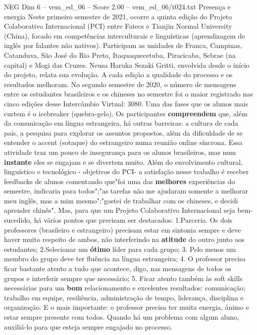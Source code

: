 \begin{textsample}{NEG Dim 6 – vem\_ed\_06 – Score 2.00 – vem\_ed\_06/t024.txt}  \label{ex:f6_neg_086}
Presença e energia Neste primeiro semestre de 2021, ocorre a quinta edição do Projeto Colaborativo Internacional (PCI) entre Fatecs e Tianjin Normal University (China), focado em competências interculturais e linguísticas (aprendizagem de inglês por falantes não nativos).
Participam as unidades de Franca, Campinas, Catanduva, São José do Rio Preto, Itaquaquecetuba, Piracicaba, Sebrae (na capital) e Mogi das Cruzes.
Neusa Haruka Sezaki Gritti, envolvida desde o início do projeto, relata sua evolução.
A cada edição a qualidade do processo e os resultados melhoram.
No segundo semestre de 2020, o número de mensagens entre os estudantes brasileiros e os chineses no semestre foi o maior registrado nas cinco edições desse Intercâmbio Virtual: 3080.
Uma das fases que os alunos mais curtem é o icebreaker (quebra-gelo).
Os participantes \textbf{compreendem} que, além da comunicação em língua estrangeira, há outras barreiras: a cultura de cada país, a pesquisa para explorar os assuntos propostos, além da dificuldade de se entender o accent (sotaque) do estrangeiro numa reunião online síncrona.
Essa atividade traz um pouco de insegurança para os alunos brasileiros, mas num \textbf{instante} eles se engajam e se divertem muito.
Além do envolvimento cultural, linguístico e tecnológico - objetivos do PCI- a satisfação nesse trabalho é receber feedbacks de alunos comentando que"foi uma das \textbf{melhores} experiências do semestre, indicaria para todos";"as tarefas não me ajudaram somente a melhorar meu inglês, mas a mim mesmo";"gostei de trabalhar com os chineses, e decidi aprender chinês".
Mas, para que um Projeto Colaborativo Internacional seja bem-sucedido, há vários pontos que precisam ser destacados: 1.Parceria.
Os dois professores (brasileiro e estrangeiro) precisam estar em sintonia sempre e deve haver muito respeito de ambos, não interferindo na \textbf{atitude} do outro junto aos estudantes; 2.Selecionar um \textbf{ótimo} líder para cada grupo; 3.
Pelo menos um membro do grupo deve ter fluência na língua estrangeira; 4.
O professor precisa ficar bastante atento a tudo que acontece, digo, nas mensagens de todos os grupos e interferir sempre que necessário; 5.
Ficar atento também às soft skills necessárias para um \textbf{bom} relacionamento e excelentes resultados: comunicação; trabalho em equipe, resiliência, administração de tempo, liderança, disciplina e organização.
E o mais importante: o professor precisa ter muita energia, ânimo e estar sempre presente com todos.
Quando há um problema com algum aluno, auxiliá-lo para que esteja sempre engajado no processo.

\end{textsample}
